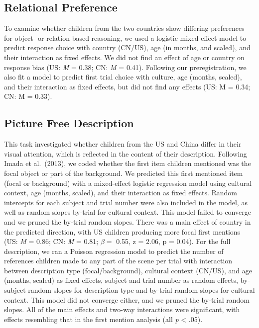 \documentclass[10pt, letterpaper]{article}
\begin{document}
\hypertarget{relational-preference}{%
\subsection{Relational Preference}\label{relational-preference}}

To examine whether children from the two countries show differing
preferences for object- or relation-based reasoning, we used a logistic
mixed effect model to predict response choice with country (CN/US), age
(in months, and scaled), and their interaction as fixed effects. We did
not find an effect of age or country on response bias (US: \emph{M} =
0.38; CN: \emph{M} = 0.41). Following our preregistration, we also fit a
model to predict first trial choice with culture, age (months, scaled),
and their interaction as fixed effects, but did not find any effects
(US: M = 0.34; CN: M = 0.33).

\hypertarget{picture-free-description-1}{%
\subsection{Picture Free Description}\label{picture-free-description-1}}

This task investigated whether children from the US and China differ in
their visual attention, which is reflected in the content of their
description. Following Imada et al.~(2013), we coded whether the first
item children mentioned was the focal object or part of the background.
We predicted this first mentioned item (focal or background) with a
mixed-effect logistic regression model using cultural context, age
(months, scaled), and their interaction as fixed effects. Random
intercepts for each subject and trial number were also included in the
model, as well as random slopes by-trial for cultural context. This
model failed to converge and we pruned the by-trial random slopes. There
was a main effect of country in the predicted direction, with US
children producing more focal first mentions (US: \emph{M} = 0.86; CN:
\emph{M} = 0.81; \(\beta =\) 0.55, z = 2.06, p = 0.04). For the full
description, we ran a Poisson regression model to predict the number of
references children made to any part of the scene per trial with
interaction between description type (focal/background), cultural
context (CN/US), and age (months, scaled) as fixed effects, subject and
trial number as random effects, by-subject random slopes for description
type and by-trial random slopes for cultural context. This model did not
converge either, and we pruned the by-trial random slopes. All of the
main effects and two-way interactions were significant, with effects
resembling that in the first mention analysis (all \emph{p} \textless{}
.05).
\end{document}
